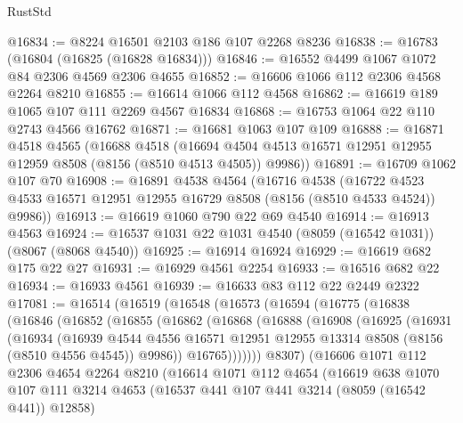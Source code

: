 \begin{lexlean}{RustStd}
\begin{coremodule}
{\begin{coremodule}
{{{{{{{{{{{{{{{{{{{{{{{{{{{{{{{{{{@16834 := @8224 @16501 @2103 @186 @107 @2268 @8236
@16838 := @16783 (@16804 (@16825 (@16828 @16834)))
@16846 := @16552 @4499 @1067 @1072 @84 @2306 @4569 @2306 @4655
@16852 := @16606 @1066 @112 @2306 @4568 @2264 @8210
@16855 := @16614 @1066 @112 @4568
@16862 := @16619 @189 @1065 @107 @111 @2269 @4567 @16834
@16868 := @16753 @1064 @22 @110 @2743 @4566 @16762
@16871 := @16681 @1063 @107 @109
@16888 := @16871
    @4518
    @4565
    (@16688
      @4518
      (@16694 @4504 @4513 @16571 @12951 @12955 @12959 @8508 (@8156 (@8510 @4513 @4505)) @9986))
@16891 := @16709 @1062 @107 @70
@16908 := @16891
    @4538
    @4564
    (@16716
      @4538
      (@16722 @4523 @4533 @16571 @12951 @12955 @16729 @8508 (@8156 (@8510 @4533 @4524)) @9986))
@16913 := @16619 @1060 @790 @22 @69 @4540
@16914 := @16913 @4563
@16924 := @16537 @1031 @22 @1031 @4540 (@8059 (@16542 @1031)) (@8067 (@8068 @4540))
@16925 := @16914 @16924
@16929 := @16619 @682 @175 @22 @27
@16931 := @16929 @4561 @2254
@16933 := @16516 @682 @22
@16934 := @16933 @4561
@16939 := @16633 @83 @112 @22 @2449 @2322
@17081 := @16514
    (@16519
      (@16548
        (@16573
          (@16594
            (@16775
              (@16838
                (@16846
                  (@16852
                    (@16855
                      (@16862
                        (@16868
                          (@16888
                            (@16908
                              (@16925
                                (@16931
                                  (@16934
                                    (@16939
                                      @4544
                                      @4556
                                      @16571
                                      @12951
                                      @12955
                                      @13314
                                      @8508
                                      (@8156 (@8510 @4556 @4545))
                                      @9986))
                                  @16765)))))))
                    @8307)
                  (@16606
                    @1071
                    @112
                    @2306
                    @4654
                    @2264
                    @8210
                    (@16614
                      @1071
                      @112
                      @4654
                      (@16619
                        @638
                        @1070
                        @107
                        @111
                        @3214
                        @4653
                        (@16537 @441 @107 @441 @3214 (@8059 (@16542 @441)) @12858)
}}}}}}}}}}}}}}}}}}}}}}}}}}}}}}}}}}
\end{coremodule}}
\end{coremodule}
\end{lexlean}
